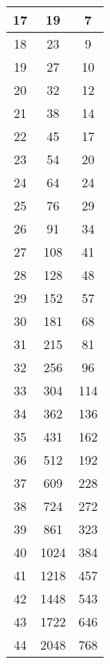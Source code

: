 \begin{figure}[h!]
\begin{tabular}{|c|c|c|}
        17           & 19            & 7      \\\hline
        18           & 23            & 9      \\\hline
        19           & 27            & 10     \\\hline
        20           & 32            & 12     \\\hline
        21           & 38            & 14     \\\hline
        22           & 45            & 17     \\\hline
        23           & 54            & 20     \\\hline
        24           & 64            & 24     \\\hline
        25           & 76            & 29     \\\hline
        26           & 91            & 34     \\\hline
        27           & 108           & 41     \\\hline
        28           & 128           & 48     \\\hline
        29           & 152           & 57     \\\hline
        30           & 181           & 68     \\\hline
        31           & 215           & 81     \\\hline
        32           & 256           & 96     \\\hline
        33           & 304           & 114    \\\hline
        34           & 362           & 136    \\\hline
        35           & 431           & 162    \\\hline
        36           & 512           & 192    \\\hline
        37           & 609           & 228    \\\hline
        38           & 724           & 272    \\\hline
        39           & 861           & 323    \\\hline
        40           & 1024          & 384    \\\hline
        41           & 1218          & 457    \\\hline
        42           & 1448          & 543    \\\hline
        43           & 1722          & 646    \\\hline
        44           & 2048          & 768    \\\hline

\end{tabular}
\end{figure}
